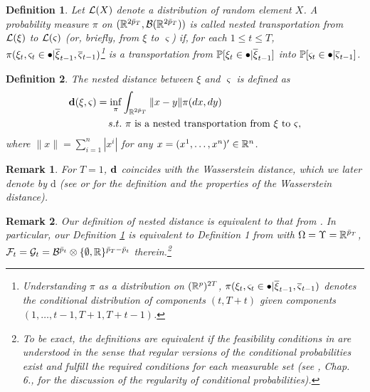 \documentclass{article}              %
\newtheorem{definition}{Definition}
\newtheorem{remark}{Remark}
\begin{document}
\begin{definition}
\label{dt} Let $\mathcal{L}(X)$ denote a distribution of random element $X$. A probability measure $\pi$
on $(\mathbb{R}^{2\bar{p}_{T}},\mathcal{B}(\mathbb{R}^{2\bar{p}_{T}}))$ 
is called \emph{nested transportation} from $\mathcal{L}(\xi)$ to $\mathcal{L}(\varsigma)$ (or, briefly, from $\xi$ to $\varsigma$)
if, for each $1\leq t\leq T$, $\pi(\xi_{t},\varsigma_{t}\in\bullet|\overline{\xi}_{t-1},\overline{\varsigma}_{t-1})$\footnote{Understanding $\pi$ as a distribution on $(\mathbb{R}^p)^{2T}$, $\pi(\xi_{t},\varsigma_{t}\in\bullet|\overline{\xi}_{t-1},\overline{\varsigma}_{t-1})$ denotes the conditional distribution of components $(t,T+t)$ given components $(1,\dots,t-1,T+1,T+t-1)$.}
 is a transportation from $\mathbb{P}[\xi_{t}\in\bullet|\overline{\xi}_{t-1}]$ into
$\mathbb{P}[\varsigma_{t}\in\bullet|\overline{\varsigma}_{t-1}]$.
\end{definition}

\begin{definition}
\label{def:d} The \emph{nested distance} between $\xi$ and $\varsigma$
is defined as
\begin{align*}
\mathbf{d}(\xi,\varsigma)=\inf_{\pi} & \int_{\mathbb{R}^{2\bar{p}_{T}}}\|x-y\|\pi(dx,dy)\\
s.t. & \text{ \ensuremath{\pi} is a nested transportation from \ensuremath{\xi\ }to \ensuremath{\varsigma}},
\end{align*}
where $\|x\|=\sum_{i=1}^{n}|x^{i}|$  for any $x = (x^1,\dots,x^n)'\in \mathbb{R}^n$.
\end{definition}

\begin{remark}
For $T=1$, $\mathbf{d}$ coincides with the Wasserstein distance, which we
later denote by $\mathrm{d}$ (see \cite{pflug2014multistage} or
\cite{villani2003topics} for the definition and the properties of
the Wasserstein distance).
\end{remark}

\begin{remark}
\label{rem:cpp}Our definition of nested distance is equivalent to that from \cite{pflug2012distance}. In particular, our Definition \ref{dt} is equivalent to Definition 1 from \cite{pflug2012distance} with $\Omega=\Upsilon=\mathbb{R}^{\bar{p}_{T}}$, $\mathcal{F}_{t}=\mathcal{G}_{t}=\mathcal{B}^{\bar{p}_{t}}\otimes\{\emptyset,\mathbb{R}\}^{\bar{p}_{T}-\bar{p}_{t}}$ therein.\footnote{To be exact, the definitions are equivalent if the feasibility conditions
in \cite{pflug2012distance} are understood in the sense that regular
versions of the conditional probabilities exist and fulfill the required
conditions for each measurable set (see \cite{Kallenberg02}, Chap.
6., for the discussion of the regularity of conditional probabilities).}
\end{remark}
\end{document}
